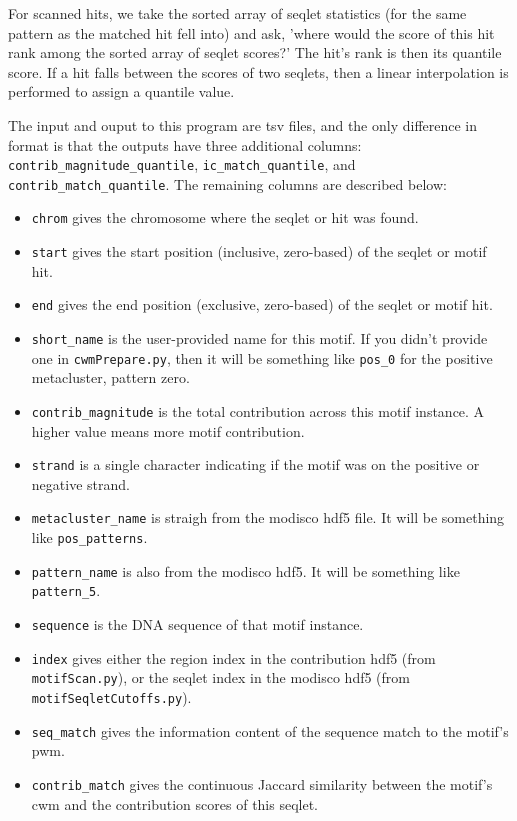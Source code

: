 \documentclass{article}
\begin{document}
For scanned hits, we take the sorted array of seqlet statistics (for the same pattern
as the matched hit fell into) and ask, 'where would the score of this hit rank among
the sorted array of seqlet scores?'
The hit's rank is then its quantile score.
If a hit falls between the scores of two seqlets, then a linear interpolation
is performed to assign a quantile value.

The input and ouput to this program are tsv files, and the only difference in format
is that the outputs have three additional columns:
\texttt{contrib\_magnitude\_quantile}, \texttt{ic\_match\_quantile}, and \texttt{contrib\_match\_quantile}.
The remaining columns are described below:

\begin{itemize}
    \item \texttt{chrom} gives the chromosome where the seqlet or hit was found.
    \item \texttt{start} gives the start position (inclusive, zero-based) of the seqlet or motif hit.
    \item \texttt{end} gives the end position (exclusive, zero-based) of the seqlet or motif hit.
    \item \texttt{short\_name} is the user-provided name for this motif. If you didn't provide
        one in \texttt{cwmPrepare.py}, then it will be something like \verb|pos_0| for the
        positive metacluster, pattern zero.
    \item \texttt{contrib\_magnitude} is the total contribution across this motif instance.
        A higher value means more motif contribution.
    \item \texttt{strand} is a single character indicating if the motif was on the positive
        or negative strand.
    \item \texttt{metacluster\_name} is straigh from the modisco hdf5 file. It will be
        something like \verb|pos_patterns|.
    \item \texttt{pattern\_name} is also from the modisco hdf5. It will be something
        like \verb|pattern_5|.
    \item \texttt{sequence} is the DNA sequence of that motif instance.
    \item \texttt{index} gives either the region index in the contribution hdf5
        (from \texttt{motifScan.py}), or the seqlet index in the modisco
        hdf5 (from \texttt{motifSeqletCutoffs.py}).
    \item \texttt{seq\_match} gives the information content of the sequence match to the motif's pwm.
    \item \texttt{contrib\_match} gives the continuous Jaccard similarity between the motif's
        cwm and the contribution scores of this seqlet.
\end{itemize}
\end{document}
